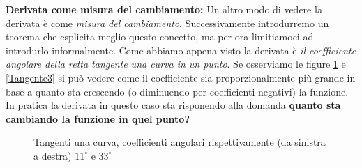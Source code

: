 
\textbf{Derivata come misura del cambiamento:} Un altro modo di vedere la derivata è come \textit{misura del cambiamento}. Successivamente introdurremo un teorema che esplicita meglio questo concetto, ma per ora limitiamoci ad introdurlo informalmente. Come abbiamo appena visto la derivata è \textit{il coefficiente angolare della retta tangente una curva in un punto}. Se osserviamo le figure \ref{Tangente12} e \ref{Tangente3} si può vedere come il coefficiente sia proporzionalmente più grande in base a quanto sta crescendo (o diminuendo per coefficienti negativi) la funzione. In pratica la derivata in questo caso sta risponendo alla domanda \textbf{quanto sta cambiando la funzione in quel punto?} 

\begin{figure}
\centering
\begin{subfigure}{0.49\textwidth}
\centering
\end{subfigure}
\begin{subfigure}{0.49\textwidth}
\centering
\end{subfigure}
\caption{Tangenti una curva, coefficienti angolari rispettivamente (da sinistra a destra) $11^\circ$ e $33^\circ$} 
\label{Tangente12}
\end{figure}

